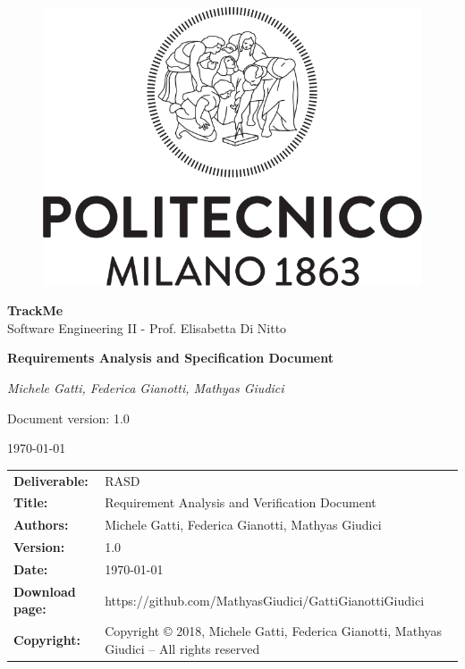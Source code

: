 \documentclass[a4paper,12pt]{report}
\begin{document}
\begin{titlepage}
\centering
	\begin{center}{
		\begin{figure}[h]
		\large
		\centering
		{\includegraphics[width=.60\linewidth]{img/logo_poli}}
        \end{figure}
    	}
	\end{center}
	\vspace{1 cm}
	{\Large {\textbf{TrackMe} \\
		Software Engineering II - Prof. Elisabetta Di Nitto} \par}
	\vspace{1.5cm}
	{\LARGE \textbf{Requirements Analysis and Specification Document} \par}
	\vspace{1.5cm}
	{\Large\itshape Michele Gatti, Federica Gianotti, Mathyas Giudici\par}
	\vspace{2cm}
	\vfill
	{\large Document version: 1.0\par}
	{\large \today \par}
\end{titlepage}

{
\begin{table}[h!]
\begin{tabu} to \textwidth { X[0.3,r,p] X[0.7,l,p] }
\textbf{Deliverable:} & RASD\\
\textbf{Title:} & Requirement Analysis and Verification Document \\
\textbf{Authors:} & Michele Gatti, Federica Gianotti, Mathyas Giudici \\
\textbf{Version:} & 1.0 \\
\textbf{Date:} & \today \\
\textbf{Download page:} & https://github.com/MathyasGiudici/GattiGianottiGiudici \\
\textbf{Copyright:} & Copyright © 2018, Michele Gatti, Federica Gianotti, Mathyas Giudici – All rights reserved \\
\end{tabu}
\end{table}

\setcounter{page}{2}
}
\end{document}
